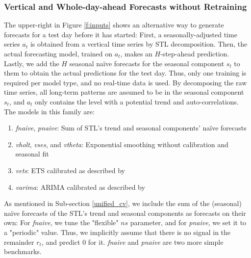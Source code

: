 \subsubsection{Vertical and Whole-day-ahead Forecasts without Retraining}
\label{vert}

The upper-right in Figure \ref{f:inputs} shows an alternative way to
    generate forecasts for a test day before it has started:
First, a seasonally-adjusted time series $a_t$ is obtained from a vertical
    time series by STL decomposition.
Then, the actual forecasting model, trained on $a_t$, makes an $H$-step-ahead
    prediction.
Lastly, we add the $H$ seasonal na\"{i}ve forecasts for the seasonal component
    $s_t$ to them to obtain the actual predictions for the test day.
Thus, only one training is required per model type, and no real-time data is
    used.
By decomposing the raw time series, all long-term patterns are assumed to be
    in the seasonal component $s_t$, and $a_t$ only contains the level with
    a potential trend and auto-correlations.
The models in this family are:
\begin{enumerate}
\item \textit{\gls{fnaive}},
      \textit{\gls{pnaive}}:
          Sum of STL's trend and seasonal components' na\"{i}ve forecasts
\item \textit{\gls{vholt}},
      \textit{\gls{vses}}, and
      \textit{\gls{vtheta}}:
          Exponential smoothing without calibration and seasonal
                       fit
\item \textit{\gls{vets}}:
          ETS calibrated as described by \cite{hyndman2008b}
\item \textit{\gls{varima}}:
          ARIMA calibrated as described by \cite{hyndman2008a}
\end{enumerate}
As mentioned in Sub-section \ref{unified_cv}, we include the sum of the
    (seasonal) na\"{i}ve forecasts of the STL's trend and seasonal components
    as forecasts on their own:
For \textit{fnaive}, we tune the "flexible" $ns$ parameter, and for
    \textit{pnaive}, we set it to a "periodic" value.
Thus, we implicitly assume that there is no signal in the remainder $r_t$, and
    predict $0$ for it.
\textit{fnaive} and \textit{pnaive} are two more simple benchmarks.
